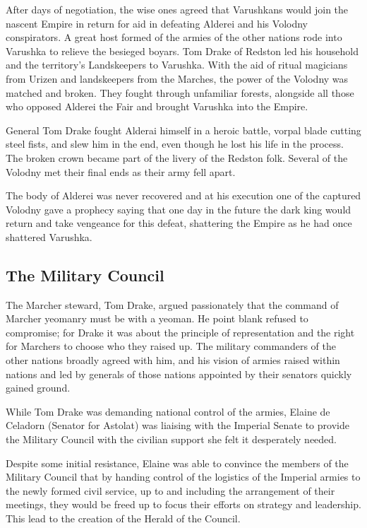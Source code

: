 After days of negotiation, the wise ones agreed that Varushkans would join the nascent Empire in return for aid in defeating Alderei and his Volodny conspirators. A great host formed of the armies of the other nations rode into Varushka to relieve the besieged boyars. Tom Drake of Redston led his household and the territory's Landskeepers to Varushka. With the aid of ritual magicians from Urizen and landskeepers from the Marches, the power of the Volodny was matched and broken. They fought through unfamiliar forests, alongside all those who opposed Alderei the Fair and brought Varushka into the Empire.

General Tom Drake fought Alderai himself in a heroic battle, vorpal blade cutting steel fists, and slew him in the end, even though he lost his life in the process. The broken crown became part of the livery of the Redston folk. Several of the Volodny met their final ends as their army fell apart.

The body of Alderei was never recovered and at his execution one of the captured Volodny gave a prophecy saying that one day in the future the dark king would return and take vengeance for this defeat, shattering the Empire as he had once shattered Varushka.

\subsection{The Military Council}
The Marcher steward, Tom Drake, argued passionately that the command of Marcher yeomanry must be with a yeoman. He point blank refused to compromise; for Drake it was about the principle of representation and the right for Marchers to choose who they raised up. The military commanders of the other nations broadly agreed with him, and his vision of armies raised within nations and led by generals of those nations appointed by their senators quickly gained ground.

While Tom Drake was demanding national control of the armies, Elaine de Celadorn (Senator for Astolat) was liaising with the Imperial Senate to provide the Military Council with the civilian support she felt it desperately needed.

Despite some initial resistance, Elaine was able to convince the members of the Military Council that by handing control of the logistics of the Imperial armies to the newly formed civil service, up to and including the arrangement of their meetings, they would be freed up to focus their efforts on strategy and leadership. This lead to the creation of the Herald of the Council.
